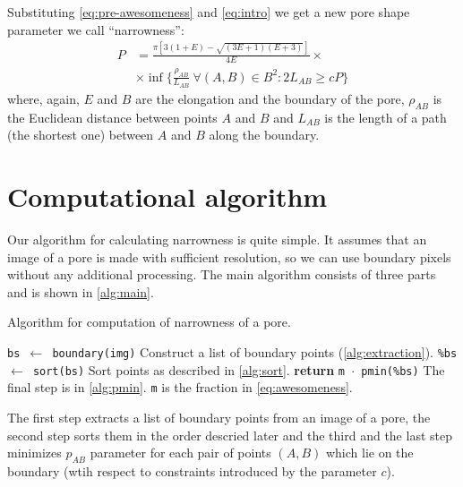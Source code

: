 \documentclass[reprint,amsmath,amssymb,aps,pre,showkeys,showpacs]{revtex4-1}
\begin{document}
Substituting \cref{eq:pre-awesomeness} and \cref{eq:intro} we get a new pore
shape parameter we call ``narrowness'':
\begin{equation}
  \begin{aligned}
    P &= \frac{\pi [3(1+E) - \sqrt{(3E+1)(E+3)}]}{4E} \times \\
    & \times \inf \{\frac{\rho_{AB}}{L_{AB}} \ \forall (A, B) \in B^2 : 2
    L_{AB} \ge cP \}
  \end{aligned}
  \label{eq:awesomeness}
\end{equation}
where, again, $E$ and $B$ are the elongation and the boundary of the pore,
$\rho_{AB}$ is the Euclidean distance between points $A$ and $B$ and $L_{AB}$ is
the length of a path (the shortest one) between $A$ and $B$ along the boundary.

\section{Computational algorithm}
\label{seq:alg}
Our algorithm for calculating narrowness is quite simple. It assumes that an
image of a pore is made with sufficient resolution, so we can use boundary
pixels without any additional processing. The main algorithm consists of three
parts and is shown in \cref{alg:main}.
\begin{algorithm}[H]
  \caption{Algorithm for computation of narrowness of a pore.}
  \label{alg:main}
  \begin{algorithmic}[1]
    \State \texttt{bs $\gets$ boundary(img)}
    \Comment Construct a list of boundary points (\cref{alg:extraction}).
    \State \texttt{\%bs $\gets$ sort(bs)}
    \Comment Sort points as described in \cref{alg:sort}.
    \State \textbf{return} \texttt{m $\cdot$ pmin(\%bs)}
    \Comment The final step is in \cref{alg:pmin}. \texttt{m} is the fraction in
    \cref{eq:awesomeness}.
    \EndProcedure
  \end{algorithmic}
\end{algorithm}

The first step extracts a list of boundary points from an image of a pore, the
second step sorts them in the order descried later and the third and the last
step minimizes $p_{AB}$ parameter for each pair of points $(A, B)$ which lie on
the boundary (wtih respect to constraints introduced by the parameter $c$).
\end{document}
